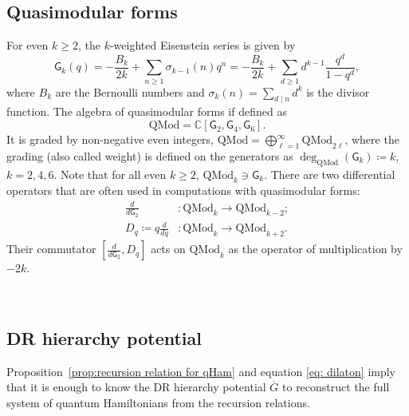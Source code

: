 \documentclass{amsart}
\numberwithin{equation}{section} %
\theoremstyle{plain}
\theoremstyle{remark}
\begin{document}
\subsection{Quasimodular forms}
For even \(k \geq 2\), the \(k\)-weighted Eisenstein series is given by
\begin{equation*}
    \mathsf{G}_k(q) = -\frac{B_k}{2k} + \sum_{n \geq 1} \sigma_{k-1}(n) q^n = -\frac{B_k}{2k} + 
    \sum_{d\geq 1} d^{k-1} \frac{q^d}{1-q^d} ,
\end{equation*}
where \(B_k\) are the Bernoulli numbers and \(\sigma_k(n) = \sum_{d \mid n} d^k\) is the divisor function. 
The algebra of quasimodular forms if defined as
\begin{equation*}
	\mathrm{QMod} = \mathbb{C}[\mathsf{G}_2, \mathsf{G}_4, \mathsf{G}_6].
\end{equation*}
It is graded by non-negative even integers, $\mathrm{QMod} = \bigoplus_{\ell=1}^\infty \mathrm{QMod}_{2\ell}$, where the grading (also called weight) is defined on the generators as $\deg_{\mathrm{QMod}} (\mathsf{G}_k) \coloneq k$, $k=2,4,6$.  Note that for all even \(k \geq 2\), $\mathrm{QMod}_k \ni \mathsf{G}_k$. 
﻿
There are two differential operators that are often used in computations with quasimodular forms:
\begin{align*}
    \frac{d}{d\mathsf{G}_2} & \colon \mathrm{QMod}_k \rightarrow \mathrm{QMod}_{k-2}; \\
    D_q \coloneqq q \frac{d}{dq} &\colon \mathrm{QMod}_k \rightarrow \mathrm{QMod}_{k+2}.
\end{align*}
Their commutator $\left[ \frac{d}{d\mathsf{G}_2}, D_q \right]$ acts on $\mathrm{QMod}_k$ as the operator of multiplication by $-2k$. 
﻿

﻿
\subsection{DR hierarchy potential}
Proposition~\ref{prop:recursion relation for qHam} and equation \eqref{eq: dilaton} imply that it is enough to know the DR hierarchy potential $\overline{G}$ to reconstruct the full system of quantum Hamiltonians from the recursion relations.\\
\end{document}
